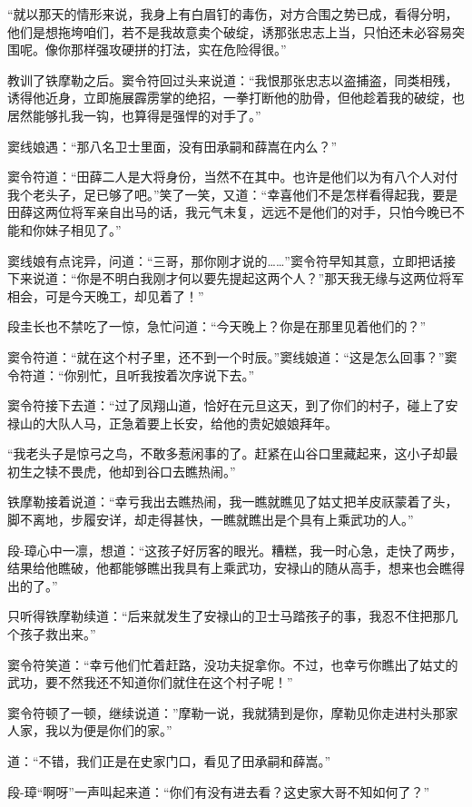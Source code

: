 \documentclass[12pt,oneside]{book}
\begin{document}
``就以那天的情形来说，我身上有白眉钉的毒伤，对方合围之势已成，看得分明，他们是想拖垮咱们，若不是我故意卖个破绽，诱那张忠志上当，只怕还未必容易突围呢。像你那样强攻硬拼的打法，实在危险得很。''

教训了铁摩勒之后。窦令符回过头来说道：``我恨那张忠志以盗捕盗，同类相残，诱得他近身，立即施展霹雳掌的绝招，一拳打断他的肋骨，但他趁着我的破绽，也居然能够扎我一钩，也算得是强悍的对手了。''

窦线娘遇：``那八名卫士里面，没有田承嗣和薛嵩在内么？''

窦令符道：``田薛二人是大将身份，当然不在其中。也许是他们以为有八个人对付我个老头子，足已够了吧。''笑了一笑，又道：``幸喜他们不是怎样看得起我，要是田薛这两位将军亲自出马的话，我元气未复，远远不是他们的对手，只怕今晚已不能和你妹子相见了。''

窦线娘有点诧异，问道：``三哥，那你刚才说的\ldots\ldots{}''窦令符早知其意，立即把话接下来说道：``你是不明白我刚才何以要先提起这两个人？''那天我无缘与这两位将军相会，可是今天晚工，却见着了！''

段圭长也不禁吃了一惊，急忙问道：``今天晚上？你是在那里见着他们的？''

窦令符道：``就在这个村子里，还不到一个时辰。''窦线娘道：``这是怎么回事？''窦令符道：``你别忙，且听我按着次序说下去。''

窦令符接下去道：``过了凤翔山道，恰好在元旦这天，到了你们的村子，碰上了安禄山的大队人马，正急着要上长安，给他的贵妃娘娘拜年。

``我老头子是惊弓之鸟，不敢多惹闲事的了。赶紧在山谷口里藏起来，这小子却最初生之犊不畏虎，他却到谷口去瞧热闹。''

铁摩勒接着说道：``幸亏我出去瞧热闹，我一瞧就瞧见了姑丈把羊皮祆蒙着了头，脚不离地，步履安详，却走得甚快，一瞧就瞧出是个具有上乘武功的人。''

段-璋心中一凛，想道：``这孩子好厉客的眼光。糟糕，我一时心急，走快了两步，结果给他瞧破，他都能够瞧出我具有上乘武功，安禄山的随从高手，想来也会瞧得出的了。''

只听得铁摩勒续道：``后来就发生了安禄山的卫士马踏孩子的事，我忍不住把那几个孩子救出来。''

窦令符笑道：``幸亏他们忙着赶路，没功夫捉拿你。不过，也幸亏你瞧出了姑丈的武功，要不然我还不知道你们就住在这个村子呢！''

窦令符顿了一顿，继续说道：''摩勒一说，我就猜到是你，摩勒见你走进村头那家人家，我以为便是你们的家。''

道：``不错，我们正是在史家门口，看见了田承嗣和薛嵩。''

段-璋``啊呀''一声叫起来道：``你们有没有进去看？这史家大哥不知如何了？''
\end{document}
